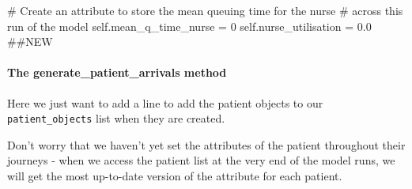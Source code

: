 \documentclass[
  letterpaper,
  DIV=11,
  numbers=noendperiod]{scrreprt}
\let\oldparagraph\paragraph
\renewcommand{\paragraph}[1]{\oldparagraph{#1}\mbox{}}
\newenvironment{Shaded}{\begin{snugshade}}{\end{snugshade}}
\newcommand{\CommentTok}[1]{\textcolor[rgb]{0.37,0.37,0.37}{#1}}
\newcommand{\DecValTok}[1]{\textcolor[rgb]{0.68,0.00,0.00}{#1}}
\newcommand{\FloatTok}[1]{\textcolor[rgb]{0.68,0.00,0.00}{#1}}
\newcommand{\NormalTok}[1]{\textcolor[rgb]{0.00,0.23,0.31}{#1}}
\newcommand{\OperatorTok}[1]{\textcolor[rgb]{0.37,0.37,0.37}{#1}}
\newcommand{\VariableTok}[1]{\textcolor[rgb]{0.07,0.07,0.07}{#1}}
\begin{document}
\begin{Shaded}
\begin{Highlighting}[]
        \CommentTok{\# Create an attribute to store the mean queuing time for the nurse}
        \CommentTok{\# across this run of the model}
        \VariableTok{self}\NormalTok{.mean\_q\_time\_nurse }\OperatorTok{=} \DecValTok{0}
        \VariableTok{self}\NormalTok{.nurse\_utilisation }\OperatorTok{=} \FloatTok{0.0} \CommentTok{\#\#NEW}
\end{Highlighting}
\end{Shaded}

\paragraph{The generate\_patient\_arrivals
method}\label{the-generate_patient_arrivals-method}

Here we just want to add a line to add the patient objects to our
\texttt{patient\_objects} list when they are created.

Don't worry that we haven't yet set the attributes of the patient
throughout their journeys - when we access the patient list at the very
end of the model runs, we will get the most up-to-date version of the
attribute for each patient.
\end{document}
